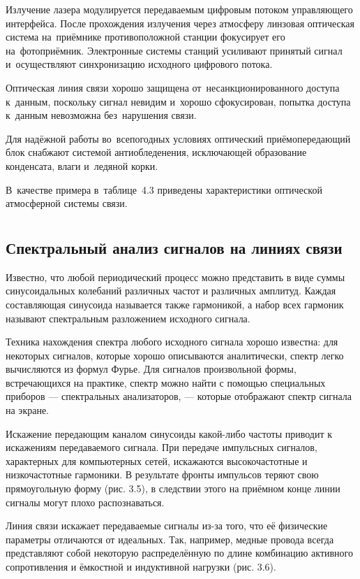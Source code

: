 \documentclass[
	a4paper,
	oneside,
	BCOR = 10mm,
	DIV = 12,
	12pt,
	headings = normal,
]{scrartcl}
\begin{document}
				Излучение лазера модулируется передаваемым цифровым потоком управляющего интерфейса. После прохождения излучения через атмосферу линзовая оптическая система на~приёмнике противоположной станции фокусирует его на~фотоприёмник. Электронные системы станций усиливают принятый сигнал и~осуществляют синхронизацию исходного цифрового потока.

				Оптическая линия связи хорошо защищена от~несанкционированного доступа к~данным, поскольку сигнал невидим и~хорошо сфокусирован, попытка доступа к~данным невозможна без~нарушения связи.

				Для надёжной работы во~всепогодных условиях оптический приёмопередающий блок снабжают системой антиобледенения, исключающей образование конденсата, влаги и~ледяной корки. 

				В~качестве примера в~таблице~4.3 приведены характеристики оптической атмосферной системы связи. 

		\section{}
			\subsection{Спектральный анализ сигналов на линиях связи}
				Известно, что любой периодический процесс можно представить в виде суммы синусоидальных колебаний различных частот и различных амплитуд. Каждая составляющая синусоида называется также гармоникой, а набор всех гармоник называют спектральным разложением исходного сигнала. 

				Техника нахождения спектра любого исходного сигнала хорошо известна: для некоторых сигналов, которые хорошо описываются аналитически, спектр легко вычисляются из формул Фурье. Для сигналов произвольной формы, встречающихся на практике, спектр можно найти с помощью специальных приборов — спектральных анализаторов, — которые отображают спектр сигнала на экране.

				Искажение передающим каналом синусоиды какой-либо частоты приводит к искажениям передаваемого сигнала. При передаче импульсных сигналов, характерных для компьютерных сетей, искажаются высокочастотные и низкочастотные гармоники. В результате фронты импульсов теряют свою прямоугольную форму (рис. 3.5), в следствии этого на приёмном конце линии сигналы могут плохо распознаваться.

				Линия связи искажает передаваемые сигналы из-за того, что её физические параметры отличаются от идеальных. Так, например, медные провода всегда представляют собой некоторую распределённую по длине комбинацию активного сопротивления и ёмкостной и индуктивной нагрузки (рис. 3.6).
\end{document}
